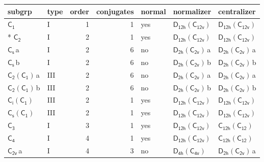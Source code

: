 \documentclass[10pt,a4paper]{article}
\numberwithin{equation}{section}
\newcommand{\grp}[1]{\mathsf{#1}}
\newcommand{\clsletter}[1]{\,{\scriptsize\color{black!55}#1}}
\begin{document}
{\small\begin{longtable}{@{}llrrlll@{}}\toprule
subgrp & type & order & conjugates & normal & normalizer & centralizer\\\midrule\endhead
\bottomrule\endfoot\endlastfoot
\href{../../../rotation/data/pdf/C1.pdf}{$\grp{C_{1}}$} & I & 1 & 1 & yes & \href{D12h-C12v.pdf}{$\grp{D_{12h}}(\grp{C_{12v}})$} & \href{D12h-C12v.pdf}{$\grp{D_{12h}}(\grp{C_{12v}})$}\\*
\href{../../../rotation/data/pdf/C2.pdf}{$\grp{C_{2}}$} & I & 2 & 1 & yes & \href{D12h-C12v.pdf}{$\grp{D_{12h}}(\grp{C_{12v}})$} & \href{D12h-C12v.pdf}{$\grp{D_{12h}}(\grp{C_{12v}})$}\\
\href{../../../rotation/data/pdf/C1v.pdf}{$\grp{C_{s}}$}\clsletter{a} & I & 2 & 6 & no & \href{D2h-C2v.pdf}{$\grp{D_{2h}}(\grp{C_{2v}})$}\clsletter{a} & \href{D2h-C2v.pdf}{$\grp{D_{2h}}(\grp{C_{2v}})$}\clsletter{a}\\
\href{../../../rotation/data/pdf/C1v.pdf}{$\grp{C_{s}}$}\clsletter{b} & I & 2 & 6 & no & \href{D2h-C2v.pdf}{$\grp{D_{2h}}(\grp{C_{2v}})$}\clsletter{b} & \href{D2h-C2v.pdf}{$\grp{D_{2h}}(\grp{C_{2v}})$}\clsletter{b}\\
\href{C2-C1.pdf}{$\grp{C_{2}}(\grp{C_{1}})$}\clsletter{a} & III & 2 & 6 & no & \href{D2h-C2v.pdf}{$\grp{D_{2h}}(\grp{C_{2v}})$}\clsletter{a} & \href{D2h-C2v.pdf}{$\grp{D_{2h}}(\grp{C_{2v}})$}\clsletter{a}\\
\href{C2-C1.pdf}{$\grp{C_{2}}(\grp{C_{1}})$}\clsletter{b} & III & 2 & 6 & no & \href{D2h-C2v.pdf}{$\grp{D_{2h}}(\grp{C_{2v}})$}\clsletter{b} & \href{D2h-C2v.pdf}{$\grp{D_{2h}}(\grp{C_{2v}})$}\clsletter{b}\\
\href{S2-C1.pdf}{$\grp{C_{i}}(\grp{C_{1}})$} & III & 2 & 1 & yes & \href{D12h-C12v.pdf}{$\grp{D_{12h}}(\grp{C_{12v}})$} & \href{D12h-C12v.pdf}{$\grp{D_{12h}}(\grp{C_{12v}})$}\\
\href{C1v-C1.pdf}{$\grp{C_{s}}(\grp{C_{1}})$} & III & 2 & 1 & yes & \href{D12h-C12v.pdf}{$\grp{D_{12h}}(\grp{C_{12v}})$} & \href{D12h-C12v.pdf}{$\grp{D_{12h}}(\grp{C_{12v}})$}\\
\href{../../../rotation/data/pdf/C3.pdf}{$\grp{C_{3}}$} & I & 3 & 1 & yes & \href{D12h-C12v.pdf}{$\grp{D_{12h}}(\grp{C_{12v}})$} & \href{C12h-C12.pdf}{$\grp{C_{12h}}(\grp{C_{12}})$}\\
\href{../../../rotation/data/pdf/C4.pdf}{$\grp{C_{4}}$} & I & 4 & 1 & yes & \href{D12h-C12v.pdf}{$\grp{D_{12h}}(\grp{C_{12v}})$} & \href{C12h-C12.pdf}{$\grp{C_{12h}}(\grp{C_{12}})$}\\
\href{../../../rotation/data/pdf/C2v.pdf}{$\grp{C_{2v}}$}\clsletter{a} & I & 4 & 3 & no & \href{D4h-C4v.pdf}{$\grp{D_{4h}}(\grp{C_{4v}})$} & \href{D2h-C2v.pdf}{$\grp{D_{2h}}(\grp{C_{2v}})$}\clsletter{a}\\

\end{longtable}}
\end{document}
